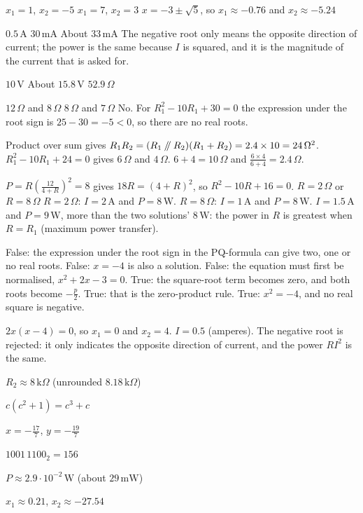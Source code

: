 \begin{facit}
  $x_1 = 1$, $x_2 = -5$  $x_1 = 7$, $x_2 = 3$
 $x = -3 \pm \sqrt{5}$, so $x_1 \approx -0.76$ and $x_2 \approx -5.24$

  $0.5\,\text{A}$  $30\,\text{mA}$  About $33\,\text{mA}$
 The negative root only means the opposite direction of current; the power is the same
because $I$ is squared, and it is the magnitude of the current that is asked for.

  $10\,\text{V}$  About $15.8\,\text{V}$  $52.9\,\Omega$

  $12\,\Omega$ and $8\,\Omega$  $8\,\Omega$ and $7\,\Omega$
 No. For $R_1^2 - 10R_1 + 30 = 0$ the expression under the root sign is
$25 - 30 = -5 < 0$, so there are no real roots.

  Product over sum gives $R_1 R_2 = (R_1 \mathbin{/\mkern-5mu/} R_2)(R_1 + R_2)
= 2.4 \times 10 = 24\,\Omega^2$.
 $R_1^2 - 10R_1 + 24 = 0$ gives $6\,\Omega$ and $4\,\Omega$.
 $6 + 4 = 10\,\Omega$ and $\frac{6 \times 4}{6 + 4} = 2.4\,\Omega$.

  $P = R\left(\frac{12}{4 + R}\right)^2 = 8$ gives $18R = (4 + R)^2$, so
$R^2 - 10R + 16 = 0$.
 $R = 2\,\Omega$ or $R = 8\,\Omega$
 $R = 2\,\Omega$: $I = 2\,\text{A}$ and $P = 8\,\text{W}$. $R = 8\,\Omega$: $I = 1\,\text{A}$
and $P = 8\,\text{W}$.
 $I = 1.5\,\text{A}$ and $P = 9\,\text{W}$, more than the two solutions' $8\,\text{W}$: the
power in $R$ is greatest when $R = R_1$ (maximum power transfer).

  False: the expression under the root sign in the PQ-formula can give two, one
or no real roots.
 False: $x = -4$ is also a solution.
 False: the equation must first be normalised, $x^2 + 2x - 3 = 0$.
 True: the square-root term becomes zero, and both roots become $-\frac{p}{2}$.
 True: that is the zero-product rule.
 True: $x^2 = -4$, and no real square is negative.

  $2x(x - 4) = 0$, so $x_1 = 0$ and $x_2 = 4$.
 $I = 0.5$ (amperes). The negative root is rejected: it only indicates the opposite
direction of current, and the power $RI^2$ is the same.

\end{facit}

\begin{facit}

 $R_2 \approx 8\,\text{k}\Omega$ (unrounded $8.18\,\text{k}\Omega$)

 $c(c^2 + 1) = c^3 + c$

 $x = -\frac{17}{7}$, $y = -\frac{19}{7}$

 $1001\,1100_2 = 156$

 $P \approx 2.9 \cdot 10^{-2}\,\text{W}$ (about $29\,\text{mW}$)

 $x_1 \approx 0.21$, $x_2 \approx -27.54$

\end{facit}
